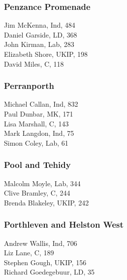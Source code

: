 \documentclass[a4paper,openany,10pt]{book}
\begin{document}
\subsubsection*{Penzance Promenade}



Jim McKenna, Ind, 484\\
Daniel Garside, LD, 368\\
John Kirman, Lab, 283\\
Elizabeth Shore, UKIP, 198\\
David Miles, C, 118\\


\subsubsection*{Perranporth}



Michael Callan, Ind, 832\\
Paul Dunbar, MK, 171\\
Lisa Marshall, C, 143\\
Mark Langdon, Ind, 75\\
Simon Coley, Lab, 61\\


\subsubsection*{Pool and Tehidy}



Malcolm Moyle, Lab, 344\\
Clive Bramley, C, 244\\
Brenda Blakeley, UKIP, 242\\


\subsubsection*{Porthleven and Helston West}



Andrew Wallis, Ind, 706\\
Liz Lane, C, 189\\
Stephen Gough, UKIP, 156\\
Richard Goedegebuur, LD, 35\\
\end{document}
